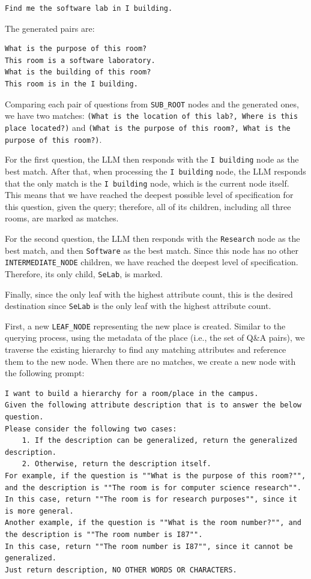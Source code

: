 \begin{lstlisting}[style=cSharp]
Find me the software lab in I building. 
\end{lstlisting}

The generated pairs are:

\begin{lstlisting}[style=cSharp]
What is the purpose of this room?
This room is a software laboratory.
What is the building of this room?
This room is in the I building.
\end{lstlisting}

Comparing each pair of questions from \texttt{SUB\_ROOT} nodes and the generated ones, we have two matches: \texttt{(What is the location of this lab?, Where is this place located?)} and \texttt{(What is the purpose of this room?, What is the purpose of this room?)}.

For the first question, the LLM then responds with the \texttt{I building} node as the best match. After that, when processing the \texttt{I building} node, the LLM responds that the only match is the \texttt{I building} node, which is the current node itself. This means that we have reached the deepest possible level of specification for this question, given the query; therefore, all of its children, including all three rooms, are marked as matches.

For the second question, the LLM then responds with the \texttt{Research} node as the best match, and then \texttt{Software} as the best match. Since this node has no other \texttt{INTERMEDIATE\_NODE} children, we have reached the deepest level of specification. Therefore, its only child, \texttt{SeLab}, is marked.

Finally, since the only leaf with the highest attribute count, this is the desired destination since \texttt{SeLab} is the only leaf with the highest attribute count.

First, a new \texttt{LEAF\_NODE} representing the new place is created. Similar to the querying process, using the metadata of the place (i.e., the set of Q\&A pairs), we traverse the existing hierarchy to find any matching attributes and reference them to the new node. When there are no matches, we create a new node with the following prompt:

\begin{lstlisting}[style=cSharp]
I want to build a hierarchy for a room/place in the campus.
Given the following attribute description that is to answer the below question.
Please consider the following two cases:
    1. If the description can be generalized, return the generalized description.
    2. Otherwise, return the description itself.
For example, if the question is ""What is the purpose of this room?"", and the description is ""The room is for computer science research"".
In this case, return ""The room is for research purposes"", since it is more general.
Another example, if the question is ""What is the room number?"", and the description is ""The room number is I87"".
In this case, return ""The room number is I87"", since it cannot be generalized.
Just return description, NO OTHER WORDS OR CHARACTERS.
\end{lstlisting}

